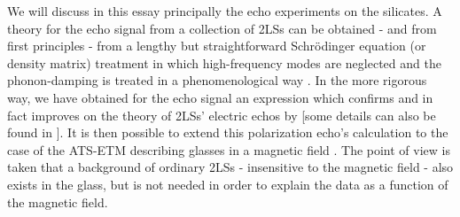 \documentclass[10pt]{article}
\begin{document}
We will discuss in this essay principally the echo experiments on the silicates. A 
theory for the echo signal from a collection of 2LSs can be obtained - and from first 
principles - from a lengthy but straightforward Schr\"odinger equation (or density
matrix) treatment in which high-frequency modes are neglected and the
phonon-damping is treated in a phenomenological way \cite{Pal2011}. In the more
rigorous way, we have obtained for the echo signal an expression which confirms 
and in fact improves on the theory of 2LSs' electric echos by \cite{Gur1990} [some 
details can also be found in \cite{JBK2016}]. It is then possible to extend this 
polarization echo's calculation to the case of the ATS-ETM describing glasses in a 
magnetic field \cite{Pal2011,Jug2014}. The point of view is taken that a 
background of ordinary 2LSs - insensitive to the magnetic field - also exists in the 
glass, but is not needed in order to explain the data as a function of the magnetic 
field.
\end{document}
